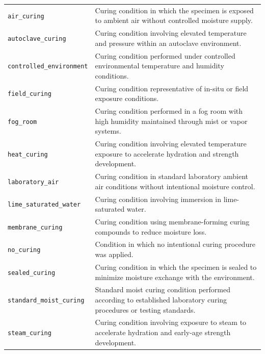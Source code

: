 \documentclass[11pt]{book}
\begin{document}
{\begin{longtable}{p{}p{}}
\texttt{air\_curing} &
Curing condition in which the specimen is exposed to ambient air without controlled moisture supply. \\

\texttt{autoclave\_curing} &
Curing condition involving elevated temperature and pressure within an autoclave environment. \\

\texttt{controlled\_environment} &
Curing condition performed under controlled environmental temperature and humidity conditions. \\

\texttt{field\_curing} &
Curing condition representative of in-situ or field exposure conditions. \\

\texttt{fog\_room} &
Curing condition performed in a fog room with high humidity maintained through mist or vapor systems. \\

\texttt{heat\_curing} &
Curing condition involving elevated temperature exposure to accelerate hydration and strength development. \\

\texttt{laboratory\_air} &
Curing condition in standard laboratory ambient air conditions without intentional moisture control. \\

\texttt{lime\_saturated\_water} &
Curing condition involving immersion in lime-saturated water. \\

\texttt{membrane\_curing} &
Curing condition using membrane-forming curing compounds to reduce moisture loss. \\

\texttt{no\_curing} &
Condition in which no intentional curing procedure was applied. \\

\texttt{sealed\_curing} &
Curing condition in which the specimen is sealed to minimize moisture exchange with the environment. \\

\texttt{standard\_moist\_curing} &
Standard moist curing condition performed according to established laboratory curing procedures or testing standards. \\

\texttt{steam\_curing} &
Curing condition involving exposure to steam to accelerate hydration and early-age strength development. \\


\end{longtable}}
\end{document}
